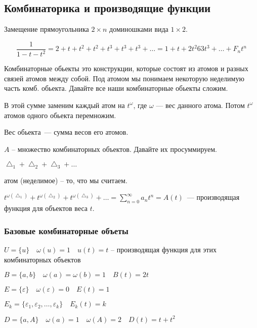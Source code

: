 \subsection{Комбинаторика и производящие функции}

\begin{example}
Замещение прямоугольника $2 \times n$ доминошками вида $1 \times 2$.

\[\frac{1}{1 - t - t^2} = 2 + t + t^2 + t^2 + t^3 + t^3 + t^3 + \ldots = 1 + t + 2t^2 6 3t^3 + \ldots + F_n t^n\]
\end{example}

Комбинаторные обьекты это конструкции, которые состоят из атомов и разных связей атомов между собой. 
Под атомом мы понимаем некоторую неделимую часть комб. обьекта.
Давайте все наши комбинаторные обьекты сложим.

В этой сумме заменим каждый атом на $t^{\omega}$, где $\omega$ --- вес данного атома.
Потом $t^\omega$ атомов одного обьекта перемножим. 

Вес обьекта~--- сумма весов его атомов.

\begin{example}
    $A$ -- множество комбинаторных объектов. Давайте их просуммируем.

    $\bigtriangleup_1 + \bigtriangleup_2 + \bigtriangleup_3 + \dots$

    атом (неделимое) -- то, что мы считаем.

    $t^{\omega(\bigtriangleup_1)} + t^{\omega(\bigtriangleup_2)} + t^{\omega(\bigtriangleup_3)} + \ldots
    = \sum_{n=0}^\infty a_n t^n = A(t)$~--- производящая функция для объектов веса $t$.
\end{example}

\subsubsection*{Базовые комбинаторные объеты}

\begin{definition}

    $U = \{ u \}\quad \omega(u) = 1\quad u(t) = t$ -- производящая функция для этих комбинаторных объектов

    $B = \{a, b\}\quad \omega(a) = \omega(b) = 1\quad B(t) = 2t$

    $E = \{\varepsilon\}\quad \omega(\varepsilon) = 0\quad E(t) = 1$

    $E_k = \{\varepsilon_1, \varepsilon_2, \ldots, \varepsilon_k\}\quad E_k(t) = k$

    $D = \{a, A\}\quad \omega(a) = 1\quad \omega(A) = 2\quad D(t) = t + t^2$
\end{definition}

